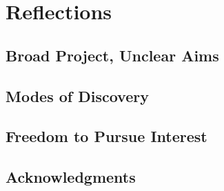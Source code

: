\chapter{Reflections}


\section{Broad Project, Unclear Aims}


\section{Modes of Discovery}


\section{Freedom to Pursue Interest}


\section{Acknowledgments}